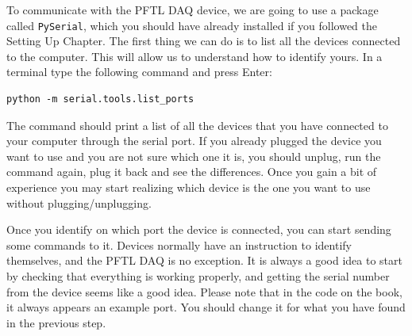 To communicate with the {PFTL DAQ} device, we are going to use a
package called \texttt{PySerial}, which you should have already
installed if you followed the Setting Up Chapter. The first
thing we can do is to list all the devices connected to the computer.
This will allow us to understand how to identify yours. In a terminal
type the following command and press Enter:

\begin{verbatim}
python -m serial.tools.list_ports
\end{verbatim}

The command should print a list of all the devices that you have
connected to your computer through the serial port. If you already
plugged the device you want to use and you are not sure which one it is,
you should unplug, run the command again, plug it back and see the
differences. Once you gain a bit of experience you may start realizing
which device is the one you want to use without plugging/unplugging.


Once you identify on which port the device is connected, you can start sending some commands to it. Devices normally have an instruction to identify themselves, and the {PFTL DAQ} is no exception. It is always a good idea to start by checking that everything is working properly, and getting the serial number from the device seems like a good idea. Please note that in the code on the book, it always
appears an example port. You should change it for what you have found in
the previous step.



